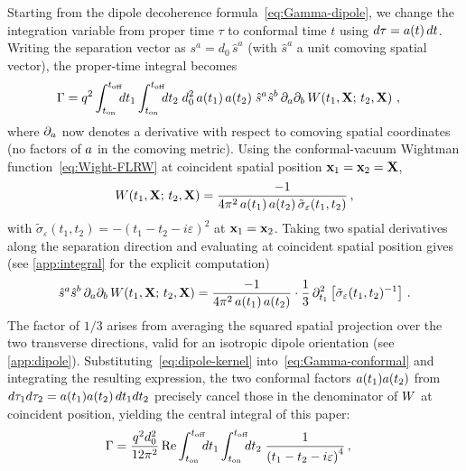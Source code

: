Starting from the dipole decoherence formula~\cref{eq:Gamma-dipole}, we change
the integration variable from proper time $\tau$ to conformal time $t$ using
$d\tau = a(t)\,dt$.  Writing the separation vector as $s^{a} = d_{0}\,\hat{s}^{a}$
(with $\hat{s}^{a}$ a unit comoving spatial vector), the proper-time integral becomes
%
\begin{align}
  \Gamma
  &=
  q^{2}
  \int_{t_{\rm on}}^{t_{\rm off}}\!\!\!dt_{1}
  \int_{t_{\rm on}}^{t_{\rm off}}\!\!\!dt_{2}\;
  d_{0}^{2}\,a(t_{1})\,a(t_{2})\;
  \hat{s}^{a}\hat{s}^{b}
  \,\partial_{a}\partial_{b}\,
  W\!\left(t_{1}, \mathbf{X};\, t_{2}, \mathbf{X}\right) \,,
  \label{eq:Gamma-conformal}
\end{align}
%
where $\partial_{a}$ now denotes a derivative with respect to comoving spatial
coordinates (no factors of $a$ in the comoving metric).  Using the
conformal-vacuum Wightman function~\cref{eq:Wight-FLRW} at coincident spatial
position $\mathbf{x}_{1} = \mathbf{x}_{2} = \mathbf{X}$,
%
\begin{equation}
  W(t_1, \mathbf{X};\, t_2, \mathbf{X})
  =
  \frac{-1}{4\pi^{2}\,a(t_{1})\,a(t_{2})
    \,\tilde{\sigma}_{\varepsilon}(t_{1}, t_{2})} \,,
  \label{eq:Wight-coincident}
\end{equation}
%
with $\tilde{\sigma}_{\varepsilon}(t_{1},t_{2}) = -(t_{1}-t_{2}-i\varepsilon)^{2}$
at $\mathbf{x}_{1} = \mathbf{x}_{2}$.  Taking two spatial derivatives along the separation
direction and evaluating at coincident spatial position gives (see \cref{app:integral}
for the explicit computation)
%
\begin{equation}
  \hat{s}^{a}\hat{s}^{b}\,\partial_{a}\partial_{b}\,
  W\!\left(t_{1}, \mathbf{X};\, t_{2}, \mathbf{X}\right)
  =
  \frac{-1}{4\pi^{2}\,a(t_{1})\,a(t_{2})}
  \cdot
  \frac{1}{3}\,\partial_{t_{1}}^{2}
  \left[\tilde{\sigma}_{\varepsilon}(t_{1},t_{2})^{-1}\right] \,.
  \label{eq:dipole-kernel}
\end{equation}
%
The factor of $1/3$ arises from averaging the squared spatial projection over
the two transverse directions, valid for an isotropic dipole orientation (see
\cref{app:dipole}).  Substituting~\cref{eq:dipole-kernel}
into~\cref{eq:Gamma-conformal} and integrating the resulting expression, the
two conformal factors $a(t_{1})a(t_{2})$ from
$d\tau_{1}d\tau_{2} = a(t_{1})a(t_{2})\,dt_{1}dt_{2}$ precisely cancel
those in the denominator of $W$ at coincident position,
yielding the central integral of this paper:
%
\begin{align}
  \Gamma
  &=
  \frac{q^{2}d_{0}^{2}}{12\pi^{2}}
  \,\mathrm{Re}
  \int_{t_{\rm on}}^{t_{\rm off}}\!\!\! dt_{1}
  \int_{t_{\rm on}}^{t_{\rm off}}\!\!\! dt_{2}\;
  \frac{1}{\left(t_{1} - t_{2} - i\varepsilon\right)^{4}} \,,
  \label{eq:decoherence-integral}
\end{align}
